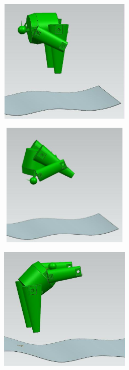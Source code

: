 \documentclass[12pt]{article}
\begin{document}
{\begin{figure}[H]
\begin{subfigure}{0.32\textwidth}
			\centering\includegraphics[height=6cm,width=1\textwidth,keepaspectratio]{var10_2.jpeg}
			\caption{}
			\label{fig:var10_2.jpeg}
		\end{subfigure}
	
		\begin{subfigure}{0.24\textwidth}
			\centering\includegraphics[height=6cm,width=1\textwidth,keepaspectratio]{var10_3.jpeg}
			\caption{}
			\label{fig:var10_3.jpeg}
		\end{subfigure}
		\begin{subfigure}{0.24\textwidth}
			\centering\includegraphics[height=6cm,width=1\textwidth,keepaspectratio]{var10_4.jpeg}
			\caption{}
			\label{fig:var10_4.jpeg}
		\end{subfigure}
		\begin{subfigure}{0.24\textwidth}

\end{subfigure}
\end{figure}}
\end{document}
